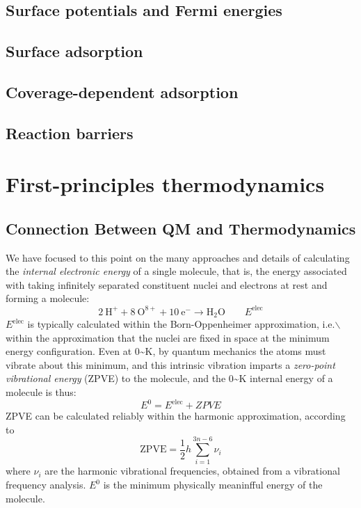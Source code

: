 \documentclass[11pt]{article}
\begin{document}
\subsection{Surface potentials and Fermi energies}
\label{sec:org2ebb9c9}
\subsection{Surface adsorption}
\label{sec:org2e65927}
\subsection{Coverage-dependent adsorption}
\label{sec:org947c3bb}
\subsection{Reaction barriers}
\label{sec:orga27efa4}

\newpage
\section{First-principles thermodynamics}
\label{sec:orgd9dfbe1}
\subsection{Connection Between QM and Thermodynamics}
\label{sec:orgc5747ff}
We have focused to this point on the many approaches and details of calculating
the \emph{internal electronic energy} of a single molecule, that is, the energy
associated with taking infinitely separated constituent nuclei and electrons at
rest and forming a molecule:
\begin{equation}
2~\mathrm{H}^+ + 8~\mathrm{O}^{8+} + 10~\mathrm{e}^- \rightarrow
\mathrm{H_2O}\qquad E^\mathrm{elec}
\end{equation}
\(E^\mathrm{elec}\) is typically calculated within the Born-Oppenheimer
approximation, i.e.$\backslash$ within the approximation that the nuclei are fixed in space
at the minimum energy configuration.  Even at 0\textasciitilde{}K, by quantum mechanics the
atoms must vibrate about this minimum, and this intrinsic vibration imparts a
\emph{zero-point vibrational energy} (ZPVE) to the molecule, and the 0\textasciitilde{}K
internal energy of a molecule is thus:
\begin{equation}
  E^0=E^\mathrm{elec} + ZPVE
\end{equation}
ZPVE can be calculated reliably within the harmonic approximation, according to
\begin{equation}
  \mathrm{ZPVE}=\frac{1}{2}h\sum_{i=1}^{3n-6}\nu_i
\end{equation}
where \(\nu_i\) are the harmonic vibrational frequencies, obtained from a
vibrational frequency analysis.  \(E^0\) is the minimum physically meaninfful
energy of the molecule.
\end{document}
